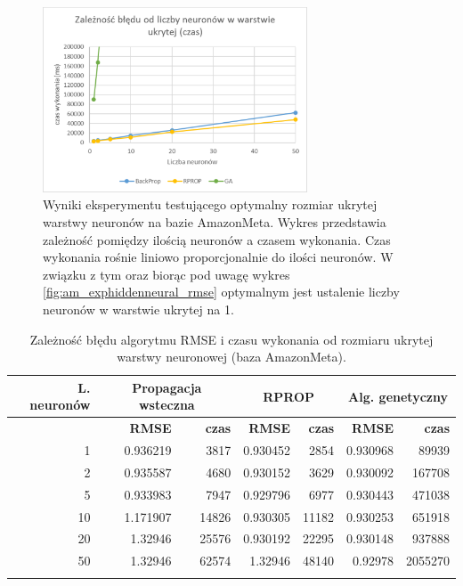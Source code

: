 \documentclass[twoside]{iisthesis}
\begin{document}
				\begin{figure}[H]
					\centering
					\includegraphics[width=0.7\textwidth]{am_exphiddenneural_time}
					\caption{Wyniki eksperymentu testującego optymalny rozmiar ukrytej warstwy neuronów na bazie AmazonMeta. Wykres przedstawia zależność pomiędzy ilością neuronów a czasem wykonania. Czas wykonania rośnie liniowo proporcjonalnie do ilości neuronów. W związku z tym oraz biorąc pod uwagę wykres \ref{fig:am_exphiddenneural_rmse} optymalnym jest ustalenie liczby neuronów w warstwie ukrytej na 1.}
					\label{fig:am_exphiddenneural_time}
				\end{figure}
	
				\begin{longtable}{r||rr|rr|rr}
					\label{tab:am_exphiddenneural}
					\centering
					\textbf{L. neuronów} &  \multicolumn{2}{c|}{\textbf{Propagacja wsteczna}}  & \multicolumn{2}{c|}{\textbf{RPROP}} & \multicolumn{2}{c}{\textbf{Alg. genetyczny}}  \\
					\hline
					& \textbf{RMSE} & \textbf{czas} & \textbf{RMSE} & \textbf{czas} & \textbf{RMSE} & \textbf{czas} \\
					\hline
					1  & 0.936219 & 3817  & 0.930452 & 2854  & 0.930968 & 89939   \\
					2  & 0.935587 & 4680  & 0.930152 & 3629  & 0.930092 & 167708  \\
					5  & 0.933983 & 7947  & 0.929796 & 6977  & 0.930443 & 471038  \\
					10 & 1.171907 & 14826 & 0.930305 & 11182 & 0.930253 & 651918  \\
					20 & 1.32946  & 25576 & 0.930192 & 22295 & 0.930148 & 937888  \\
					50 & 1.32946  & 62574 & 1.32946  & 48140 & 0.92978  & 2055270 \\	
					\caption{Zależność błędu algorytmu RMSE i czasu wykonania od rozmiaru ukrytej warstwy neuronowej (baza AmazonMeta).}
				\end{longtable}
			
\end{document}
